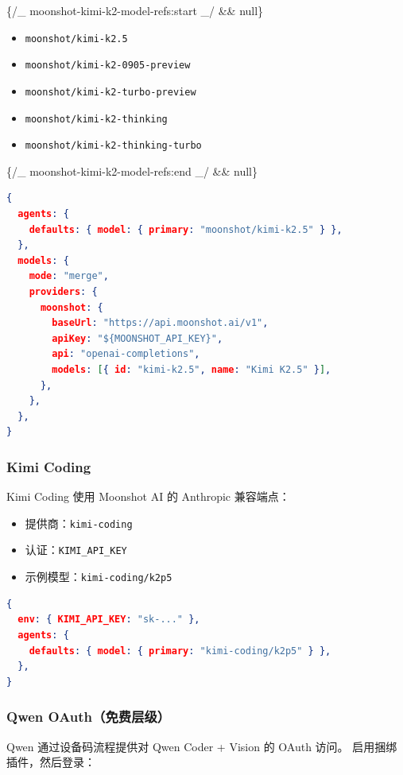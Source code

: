 \{/\_ moonshot-kimi-k2-model-refs:start \_/ \&\& null\}

\begin{itemize}
  \item \texttt{moonshot/kimi-k2.5}
  \item \texttt{moonshot/kimi-k2-0905-preview}
  \item \texttt{moonshot/kimi-k2-turbo-preview}
  \item \texttt{moonshot/kimi-k2-thinking}
  \item \texttt{moonshot/kimi-k2-thinking-turbo}
\end{itemize}

\{/\_ moonshot-kimi-k2-model-refs:end \_/ \&\& null\}

\begin{lstlisting}[language=json]
{
  agents: {
    defaults: { model: { primary: "moonshot/kimi-k2.5" } },
  },
  models: {
    mode: "merge",
    providers: {
      moonshot: {
        baseUrl: "https://api.moonshot.ai/v1",
        apiKey: "${MOONSHOT_API_KEY}",
        api: "openai-completions",
        models: [{ id: "kimi-k2.5", name: "Kimi K2.5" }],
      },
    },
  },
}
\end{lstlisting}


\subsubsection{Kimi Coding}


Kimi Coding 使用 Moonshot AI 的 Anthropic 兼容端点：

\begin{itemize}
  \item 提供商：\texttt{kimi-coding}
  \item 认证：\texttt{KIMI\_API\_KEY}
  \item 示例模型：\texttt{kimi-coding/k2p5}
\end{itemize}


\begin{lstlisting}[language=json]
{
  env: { KIMI_API_KEY: "sk-..." },
  agents: {
    defaults: { model: { primary: "kimi-coding/k2p5" } },
  },
}
\end{lstlisting}


\subsubsection{Qwen OAuth（免费层级）}


Qwen 通过设备码流程提供对 Qwen Coder + Vision 的 OAuth 访问。
启用捆绑插件，然后登录：

